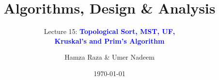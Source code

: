 \documentclass[10pt,aspectratio=43]{beamer}
\title{Algorithms, Design \& Analysis}
\subtitle{Lecture 15: \textcolor{blue}{\textbf{Topological Sort, MST, UF,}} \\ 
\textcolor{blue}{\textbf{Kruskal's and Prim's Algorithm}}}
\author[BSCS23177 \& BSCS23183]{Hamza Raza \& Umer Nadeem}
\institute[ITU]{Information Technology University}
\date{\today}
\begin{document}
\begin{frame}
    \titlepage
\end{frame}


\end{document}
